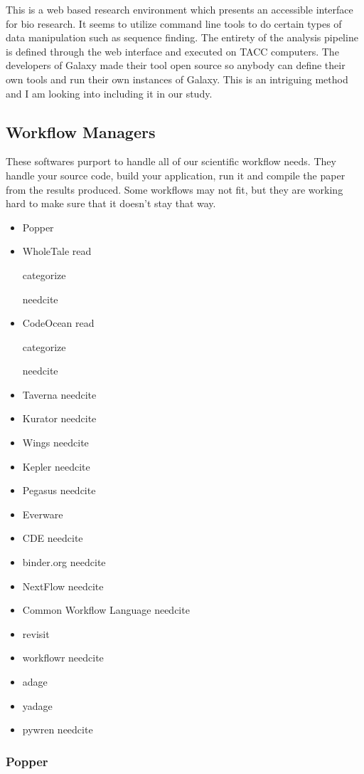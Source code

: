 \documentclass[american]{article}
\newcommand{\Read}{
	\gls{read}
}
\newcommand{\categorize}{
	\gls{categorize}
}
\newcommand{\needcite}{
	\gls{needcite}
}
\begin{document}
This is a web based research environment which presents an accessible interface for bio research. It seems to utilize command line tools to do certain types of data manipulation such as sequence finding. The entirety of the analysis pipeline is defined through the web interface and executed on TACC computers. The developers of Galaxy made their tool open source so anybody can define their own tools and run their own instances of Galaxy. This is an intriguing method and I am looking into including it in our study.

\subsection{Workflow Managers} \label{sec:software-managers}

These softwares purport to handle all of our scientific workflow needs. They handle your source code, build your application, run it and compile the paper from the results produced. Some workflows may not fit, but they are working hard to make sure that it doesn't stay that way.

\begin{itemize}
\item Popper \cite{popper}
\item WholeTale \Read \categorize \needcite
\item CodeOcean \Read \categorize \needcite
\item Taverna \needcite
\item Kurator \needcite
\item Wings \needcite
\item Kepler \needcite
\item Pegasus \needcite
\item Everware \cite{everware}
\item CDE \needcite
\item binder.org \needcite
\item NextFlow \needcite
\item Common Workflow Language \needcite
\item revisit \cite{matloff-revisit-2017}
\item workflowr \needcite
\item adage
\item yadage \cite{cranmer-yadage-packtivity-2017}
\item pywren \needcite
\end{itemize}

\subsubsection{Popper} \label{sec:software-managers-popper}
\end{document}
